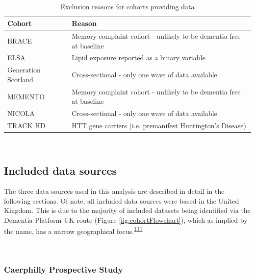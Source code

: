 \documentclass[a4paper, twoside]{templates/ociamthesis}
\begin{document}
~\\




\begin{table}[H]

\caption[Exclusion reasons for cohorts providing data]{\label{tab:dataExcluded-table}Exclusion reasons for cohorts providing data}
\centering
\begin{tabular}[t]{>{\raggedright\arraybackslash}p{12em}>{\raggedright\arraybackslash}p{20em}}
\toprule
\textbf{Cohort} & \textbf{Reason}\\
\midrule
BRACE & Memory complaint cohort - unlikely to be dementia free at baseline\\
\midrule
ELSA & Lipid exposure reported as a binary variable\\
\midrule
Generation Scotland & Cross-sectional - only one wave of data available\\
\midrule
MEMENTO & Memory complaint cohort - unlikely to be dementia free at baseline\\
\midrule
NICOLA & Cross-sectional - only one wave of data available\\
\midrule
\addlinespace
TRACK HD & HTT gene carriers (i.e. premanifest Huntington's Disease)\\
\bottomrule
\end{tabular}
\end{table}

~

\hypertarget{included-data-sources}{%
\subsection{Included data sources}\label{included-data-sources}}

The three data sources used in this analysis are described in detail in the following sections. Of note, all included data sources were based in the United Kingdom. This is due to the majority of included datasets being identified via the Dementia Platform UK route (Figure \ref{fig:cohortFlowchart}), which as implied by the name, has a narrow geographical focus.\textsuperscript{\protect\hyperlink{ref-bauermeister2020}{111}}

~

\hypertarget{caerphilly-prospective-study}{%
\subsubsection{Caerphilly Prospective Study}\label{caerphilly-prospective-study}}
\end{document}
